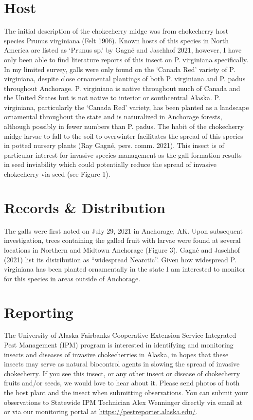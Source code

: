 \section{Host}
 The initial description of the chokecherry midge was from chokecherry host species Prunus virginiana (Felt 1906). Known hosts of this species in North America are listed as ‘Prunus sp.’ by Gagn\'{e} and Jaschhof 2021, however, I have only been able to find literature reports of this insect on P. virginiana specifically. In my limited survey, galls were only found on the ‘Canada Red’ variety of P. virginiana, despite close ornamental plantings of both P. virginiana and P. padus throughout Anchorage. P. virginiana is native throughout much of Canada and the United States but is not native to interior or southcentral Alaska. P. virginiana, particularly the ‘Canada Red’ variety, has been planted as a landscape ornamental throughout the state and is naturalized in Anchorage forests, although possibly in fewer numbers than P. padus. The habit of the chokecherry midge larvae to fall to the soil to overwinter facilitates the spread of this species in potted nursery plants (Ray Gagn\'{e}, pers. comm. 2021). This insect is of particular interest for invasive species management as the gall formation results in seed inviability which could potentially reduce the spread of invasive chokecherry via seed (see Figure 1).
 
\section{Records \& Distribution} The galls were first noted on July 29, 2021 in Anchorage, AK. Upon subsequent investigation, trees containing the galled fruit with larvae were found at several locations in Northern and Midtown Anchorage (Figure 3). Gagn\'{e} and Jaschhof (2021) list its distribution as ``widespread Nearctic''. Given how widespread P. virginiana has been planted ornamentally in the state I am interested to monitor for this species in areas outside of Anchorage. 

\section{Reporting}
 The University of Alaska Fairbanks Cooperative Extension Service Integrated Pest Management (IPM) program is interested in identifying and monitoring insects and diseases of invasive chokecherries in Alaska, in hopes that these insects may serve as natural biocontrol agents in slowing the spread of invasive chokecherry. If you see this insect, or any other insect or disease of chokecherry fruits and/or seeds, we would love to hear about it. Please send photos of both the host plant and the insect when submitting observations. You can submit your observations to Statewide IPM Technician Alex Wenninger directly via email at  or via our monitoring portal at \url{https://pestreporter.alaska.edu/}.  
 
